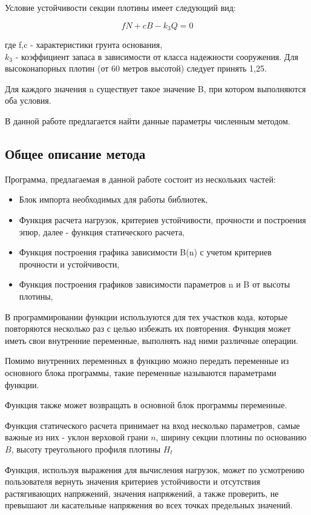 \documentclass[12pt,a4paper,oneside,draft,titlepage]{article}
\begin{document}
Условие устойчивости секции плотины имеет следующий вид:

$$ f  N + c  B - k_3  Q = 0 $$

где f,c - характеристики грунта основания,\\
$k_3$ - коэффициент запаса в зависимости от класса надежности сооружения. Для высоконапорных плотин (от 60 метров высотой) следует принять 1,25.

Для каждого значения n существует такое значение B, при котором выполняются оба условия.

В данной работе предлагается найти данные параметры численным методом.

\subsection{Общее описание метода}

Программа, предлагаемая в данной работе состоит из нескольких частей:

\begin{itemize}
	\item Блок импорта необходимых для работы библиотек,
	\item Функция расчета нагрузок, критериев устойчивости, прочности и построения эпюр, далее - функция статического расчета,
	\item Функция построения графика зависимости B(n) с учетом критериев прочности и устойчивости,
	\item Функция построения графиков зависимости параметров n и B от высоты плотины,
\end{itemize}

В программировании функции используются для тех участков кода, которые повторяются несколько раз с целью избежать их повторения. Функция может иметь свои внутренние переменные, выполнять над ними различные операции.

Помимо внутренних переменных в функцию можно передать переменные из основного блока программы, такие переменные называются параметрами функции.

Функция также может возвращать в основной блок программы переменные.

Функция статического расчета принимает на вход несколько параметров, самые важные из них - уклон верховой грани $n$, ширину секции плотины по основанию $B$, высоту треугольного профиля плотины $H_t$

Функция, используя выражения для вычисления нагрузок, может по усмотрению пользователя вернуть значения критериев устойчивости и отсутствия растягивающих напряжений, значения напряжений, а также проверить, не превышают ли касательные напряжения во всех точках предельных значений.
\end{document}
